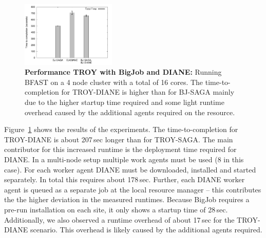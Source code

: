 \documentclass[conference,final]{IEEEtran}
\newcommand{\smnote}[1]{ {\textcolor{green} { ***sharath: #1 }}}
\newcommand{\smnote}[1]{}
\newcommand{\up}{\vspace*{-1em}}
\begin{document}


\begin{figure}[t]
	\centering
		\includegraphics[width=0.4\textwidth]{perf/perf-bfast-bj.pdf}
	\caption{\textbf{Performance TROY with BigJob and DIANE:} Running BFAST 
	on a 4 node cluster with a total of 16 cores. The time-to-completion for 
	TROY-DIANE is higher than for BJ-SAGA mainly due to the higher startup 
	time required and some light runtime overhead caused by the additional 
	agents required on the resource.\up\up}
	\label{fig:perf_perf-bfast-bj}
\end{figure}



Figure~\ref{fig:perf_perf-bfast-bj} shows the results of the
experiments. The time-to-completion for TROY-DIANE is about 207\,sec
longer than for TROY-SAGA. The main contributor for this increased
runtime is the deployment time required for DIANE. In a multi-node
setup multiple work agents must be used (8 in this case).  For each
worker agent DIANE must be downloaded, installed and started
separately. In total this requires about 178\,sec. Further, each DIANE
worker agent is queued as a separate job at the local resource manager
-- this contributes the the higher deviation in the measured
runtimes. Because BigJob requires a pre-run installation on each site,
it only shows a startup time of 28\,sec. Additionally, we also
observed a runtime overhead of about 17\,sec for the TROY-DIANE
scenario. This overhead is likely caused by the additional agents
required.
\end{document}
